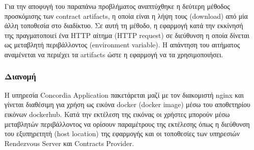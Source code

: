 Για την αποφυγή του παραπάνω προβλήματος αναπτύχθηκε η δεύτερη μέθοδος προσκόμισης των contract artifacts, η οποία είναι η λήψη τους (download) από μία άλλη τοποθεσία στο διαδίκτυο. Σε αυτή τη μέθοδο, η εφαρμογή κατά την εκκίνησή της πραγματοποιεί ένα HTTP αίτημα (HTTP request) σε διεύθυνση η οποία δίνεται ως μεταβλητή περιβάλλοντος (environment variable). Η απάντηση του αιτήματος αναμένεται να περιέχει τα artifacts ώστε η εφαρμογή να τα χρησιμοποιήσει.

\subsubsection{Διανομή}

Η υπηρεσία Concordia Application πακετάρεται μαζί με τον διακομιστή nginx και γίνεται διαθέσιμη για χρήση ως εικόνα docker (docker image) μέσω του αποθετηρίου εικόνων dockerhub. Κατά την εκτέλεση της εικόνας οι χρήστες μπορούν μέσω μεταβλητών περιβάλλοντος να ορίσουν παραμέτρους της εκτέλεσης όπως η διεύθυνση του εξυπηρετητή (host location) της εφαρμογής και οι τοποθεσίες των υπηρεσιών Rendezvous Server και Contracts Provider.